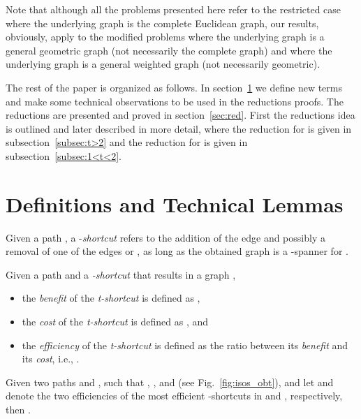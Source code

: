 \documentclass[a4paper]{llncs}
\begin{document}
Note that although all the problems presented here refer to the restricted case 
where the underlying graph is the complete Euclidean graph, 
our results, obviously, apply to the modified problems where the underlying graph is
a general geometric graph (not necessarily the complete graph) and 
where the underlying graph is a general weighted graph (not necessarily geometric).


The rest of the paper is organized as follows.
In section~\ref{sec:defs} we define new terms and make some technical observations 
to be used in the reductions proofs.
The reductions are presented and proved in section~\ref{sec:red}. 
First the reductions idea is outlined and later described in more detail,
where the reduction for  is given in subsection~\ref{subsec:t>2}
and the reduction for  is given in subsection~\ref{subsec:1<t<2}.





\section{Definitions and Technical Lemmas}\label{sec:defs}

\begin{definition}
Given a path , a -\emph{shortcut} refers to the addition of the edge 
and possibly a removal of one of the edges  or ,
as long as the obtained graph is a -spanner for .
\end{definition}

\begin{definition}\label{def:effi}
Given a path  and
a \emph{-shortcut} that results in a graph , 
\begin{itemize}
\item the \emph{benefit} of the \emph{t-shortcut} is defined as ,
\item the \emph{cost} of the \emph{t-shortcut} is defined as , and
\item the \emph{efficiency} of the \emph{t-shortcut} is defined as the ratio between its \emph{benefit} and its \emph{cost},
i.e., .
\end{itemize}
\end{definition}



\begin{lemma}\label{lem:isos}
Given two paths  and , such that , ,
and  (see Fig.~\ref{fig:isos_obt}), 
and let  and  denote the two efficiencies of the most efficient -shortcuts in  and , respectively, then .
\end{lemma}
\end{document}

